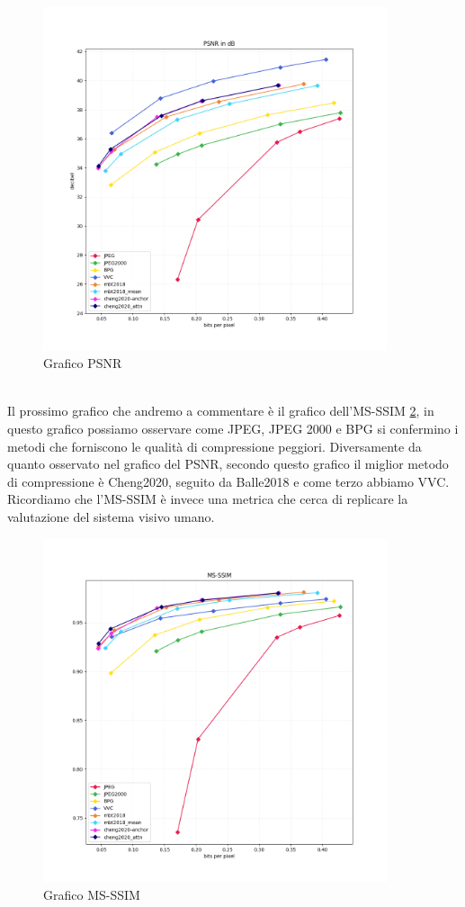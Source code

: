 \begin{figure}[!h]
    \centering
    \includegraphics[width=0.9\textwidth]{Immagini/METRICS/PSNR.png}
    \caption{Grafico PSNR}
    \label{fig:PSNRGraph}
\end{figure}\\
Il prossimo grafico che andremo a commentare è il grafico dell’MS-SSIM \ref{fig:MSSSIMGraph}, in questo grafico possiamo osservare come JPEG, JPEG 2000 e BPG si confermino i metodi che forniscono le qualità di compressione peggiori. Diversamente da quanto osservato nel grafico del PSNR, secondo questo grafico il miglior metodo di compressione è Cheng2020, seguito da Balle2018 e come terzo abbiamo VVC.\\
Ricordiamo che l’MS-SSIM è invece una metrica che cerca di replicare la valutazione del sistema visivo umano.\\
\begin{figure}[!h]
    \centering
    \includegraphics[width=0.9\textwidth]{Immagini/METRICS/MS-SSIM.png}
    \caption{Grafico MS-SSIM}
    \label{fig:MSSSIMGraph}
\end{figure}\\
